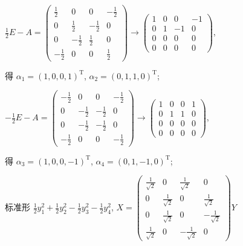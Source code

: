 \begin{enumerate}
			       \( \frac{1}{2}E - A = \begin{pmatrix}
				       \frac{1}{2}  & 0            & 0            & -\frac{1}{2} \\
				       0            & \frac{1}{2}  & -\frac{1}{2} & 0            \\
				       0            & -\frac{1}{2} & \frac{1}{2}  & 0            \\
				       -\frac{1}{2} & 0            & 0            & \frac{1}{2}
			       \end{pmatrix} \rightarrow \begin{pmatrix}
				       1 & 0 & 0  & -1 \\
				       0 & 1 & -1 & 0  \\
				       0 & 0 & 0  & 0  \\
				       0 & 0 & 0  & 0
			       \end{pmatrix}\),

			       得 \(\alpha_{1} = (1, 0, 0, 1)^{\mathrm{T}} \), \( \alpha_{2} = (0, 1, 1, 0)^{\mathrm{T}} \);

			       \( -\frac{1}{2}E - A = \begin{pmatrix}
				       -\frac{1}{2} & 0            & 0            & -\frac{1}{2} \\
				       0            & -\frac{1}{2} & -\frac{1}{2} & 0            \\
				       0            & -\frac{1}{2} & -\frac{1}{2} & 0            \\
				       -\frac{1}{2} & 0            & 0            & -\frac{1}{2}
			       \end{pmatrix} \rightarrow \begin{pmatrix}
				       1 & 0 & 0 & 1 \\
				       0 & 1 & 1 & 0 \\
				       0 & 0 & 0 & 0 \\
				       0 & 0 & 0 & 0
			       \end{pmatrix}\),

			       得 \(\alpha_{3} = (1, 0, 0, -1)^{\mathrm{T}} \), \( \alpha_{4} = (0, 1, -1, 0)^{\mathrm{T}} \);

			       标准形 \( \frac{1}{2}y_{1}^{2} + \frac{1}{2}y_{2}^{2} - \frac{1}{2}y_{3}^{2} - \frac{1}{2}y_{4}^{2} \), \( X = \begin{pmatrix}
				       \frac{1}{\sqrt{2}} & 0                  & \frac{1}{\sqrt{2}}  & 0                   \\
				       0                  & \frac{1}{\sqrt{2}} & 0                   & \frac{1}{\sqrt{2}}  \\
				       0                  & \frac{1}{\sqrt{2}} & 0                   & -\frac{1}{\sqrt{2}} \\
				       \frac{1}{\sqrt{2}} & 0                  & -\frac{1}{\sqrt{2}} & 0
			       \end{pmatrix}Y \)
		 \end{enumerate}


